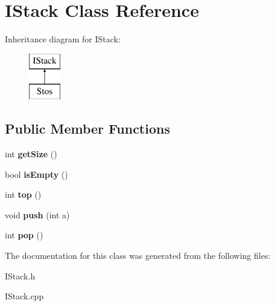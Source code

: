 \hypertarget{class_i_stack}{\section{I\-Stack Class Reference}
\label{class_i_stack}
}
Inheritance diagram for I\-Stack\-:\begin{figure}[H]
\begin{center}
\leavevmode
\includegraphics[height=2.000000cm]{class_i_stack}
\end{center}
\end{figure}
\subsection*{Public Member Functions}
\begin{DoxyCompactItemize}
\item 
\hypertarget{class_i_stack_aaea872f831c1ab5c064bed14f552e1fe}{int {\bfseries get\-Size} ()}\label{class_i_stack_aaea872f831c1ab5c064bed14f552e1fe}

\item 
\hypertarget{class_i_stack_a237e08de5a3cebe1266c5f4e038fa2e3}{bool {\bfseries is\-Empty} ()}\label{class_i_stack_a237e08de5a3cebe1266c5f4e038fa2e3}

\item 
\hypertarget{class_i_stack_ab2daefea39cc1ff2c2e1889a0acc6373}{int {\bfseries top} ()}\label{class_i_stack_ab2daefea39cc1ff2c2e1889a0acc6373}

\item 
\hypertarget{class_i_stack_a6f1563e90b6e1194c0e8415fa0275138}{void {\bfseries push} (int a)}\label{class_i_stack_a6f1563e90b6e1194c0e8415fa0275138}

\item 
\hypertarget{class_i_stack_a9bcbe8c107e81e4d92f8707382d0a6d1}{int {\bfseries pop} ()}\label{class_i_stack_a9bcbe8c107e81e4d92f8707382d0a6d1}

\end{DoxyCompactItemize}


The documentation for this class was generated from the following files\-:\begin{DoxyCompactItemize}
\item 
I\-Stack.\-h\item 
I\-Stack.\-cpp\end{DoxyCompactItemize}
